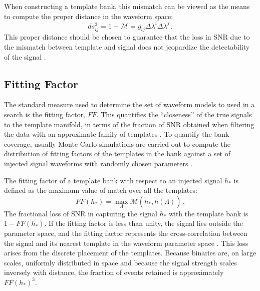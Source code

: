\documentclass[binding=0.6cm, LaM]{sapthesis}
\begin{document}
        When constructing a template bank, this mismatch can be viewed as the means
	to compute the proper distance in the waveform space:
        \begin{equation}
          ds_{ij}^2 = 1 − \mathcal{M} = g_{ij} \Delta \lambda^i \Delta \lambda^j\,.
        \end{equation}
	This proper distance should be chosen to guarantee that the loss in SNR due to the mismatch 
	between template and signal does not jeopardize the detectability of the signal \cite{30}.

\subsection{Fitting Factor}
\label{subsec:fittingfactor}
	The standard measure used to determine the set of waveform models to used in a
        search is the fitting factor, $FF$.
	This quantifies the ``closeness'' of 
	the true signals to the template manifold, in terms of the fraction of 
	SNR obtained when filtering 
	the data with an approximate family of templates \cite{31}. 
	To quantify the bank coverage, usually Monte-Carlo simulations are carried out
	to compute the distribution of fitting factors of the templates in the bank against 
	a set of injected signal waveforms with randomly chosen parameters \cite{32}.

	The fitting factor of a template bank with respect to an injected signal $h_{*}$ 
	is defined as the maximum value of match over all the templates:
        \begin{equation}
          FF(h_{*}) = \max_\Lambda \mathcal{M}(\tilde{h}_{*}, \tilde{h}(\Lambda))\,.
        \end{equation}
	The fractional loss of SNR in capturing the signal 
	$h_{*}$ with the template bank is $1 - FF(h_{*})$.
	If the fitting factor is less than unity, the signal lies outside the parameter space, 
	and the fitting factor represents the cross-correlation between 
	the signal and its nearest template in the waveform parameter space \cite{33}. 
	This loss arises from the discrete placement of the templates. 
	Because binaries are, on large scales, uniformly distributed in space 
	and because the signal strength scales inversely with distance, 
	the fraction of events retained is approximately $FF(h_*)^3$.
\end{document}
